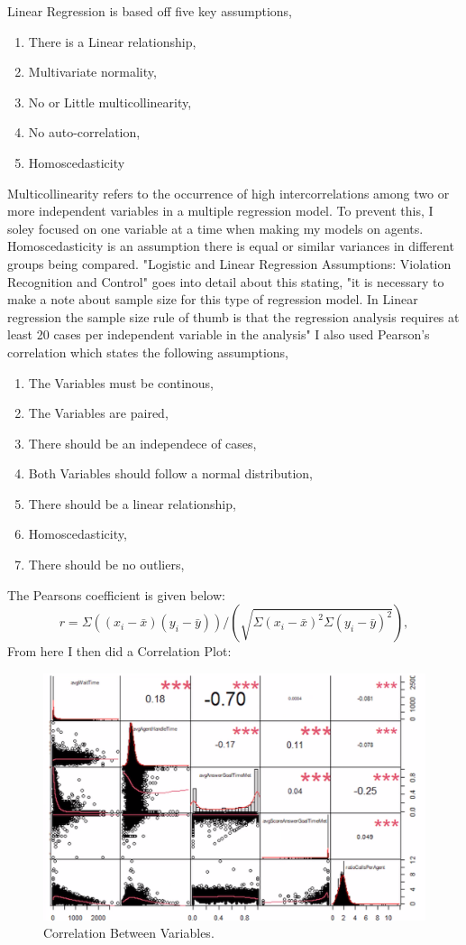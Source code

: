 \documentclass[12pt]{article}
\begin{document}
  Linear Regression is based off five key assumptions,
  \begin{enumerate}
  \item There is a Linear relationship,
  \item Multivariate normality,
  \item No or Little multicollinearity,
  \item No auto-correlation,
  \item Homoscedasticity
\end{enumerate} Multicollinearity refers to the occurrence of high intercorrelations among two or more independent variables in a multiple regression model.
To prevent this, I soley focused on one variable at a time when making my models on agents. Homoscedasticity is an assumption there is equal or similar variances in different groups being compared.
"Logistic and Linear Regression Assumptions: Violation Recognition and Control" goes into detail about this stating, "it is necessary to make a note about sample size for this type of regression model. In Linear
regression the sample size rule of thumb is that the regression analysis requires at least 20 cases per
independent variable in the analysis"\citep{schreiber2018logistic} 
I also used Pearson's correlation which states the following assumptions,
\begin{enumerate}
  \item The Variables must be continous,
  \item The Variables are paired,
  \item There should be an independece of cases,
  \item Both Variables should follow a normal distribution,
  \item There should be a linear relationship,
  \item Homoscedasticity,
  \item There should be no outliers,
\end{enumerate}
The Pearsons coefficient is given below:
\begin{equation}
  \label{eq:Pearson}
r= \Sigma((x_i - \bar{x})(y_i-\bar{y}))/(\sqrt{\Sigma{(x_i-\bar{x})^2}\Sigma{(y_i-\bar{y})^2}}),
\end{equation}
From here I then did a Correlation Plot:
\begin{figure}[H]
  \centering
  \includegraphics[width=\textwidth]{Correlation.png}
  \caption{Correlation Between Variables.}
  \label{fig:Correlation}
\end{figure}
\end{document}
